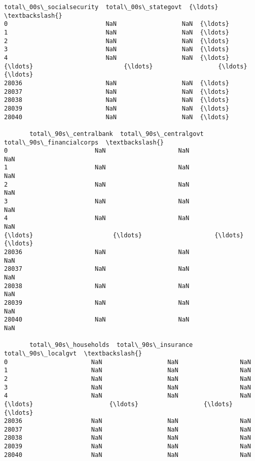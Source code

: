 \documentclass[11pt]{article}
\begin{document}
\begin{Verbatim}[commandchars=\\\{\}]
       total\_00s\_socialsecurity  total\_00s\_stategovt  {\ldots}  \textbackslash{}
0                           NaN                  NaN  {\ldots}
1                           NaN                  NaN  {\ldots}
2                           NaN                  NaN  {\ldots}
3                           NaN                  NaN  {\ldots}
4                           NaN                  NaN  {\ldots}
{\ldots}                         {\ldots}                  {\ldots}  {\ldots}
28036                       NaN                  NaN  {\ldots}
28037                       NaN                  NaN  {\ldots}
28038                       NaN                  NaN  {\ldots}
28039                       NaN                  NaN  {\ldots}
28040                       NaN                  NaN  {\ldots}

       total\_90s\_centralbank  total\_90s\_centralgovt  total\_90s\_financialcorps  \textbackslash{}
0                        NaN                    NaN                       NaN
1                        NaN                    NaN                       NaN
2                        NaN                    NaN                       NaN
3                        NaN                    NaN                       NaN
4                        NaN                    NaN                       NaN
{\ldots}                      {\ldots}                    {\ldots}                       {\ldots}
28036                    NaN                    NaN                       NaN
28037                    NaN                    NaN                       NaN
28038                    NaN                    NaN                       NaN
28039                    NaN                    NaN                       NaN
28040                    NaN                    NaN                       NaN

       total\_90s\_households  total\_90s\_insurance  total\_90s\_localgvt  \textbackslash{}
0                       NaN                  NaN                 NaN
1                       NaN                  NaN                 NaN
2                       NaN                  NaN                 NaN
3                       NaN                  NaN                 NaN
4                       NaN                  NaN                 NaN
{\ldots}                     {\ldots}                  {\ldots}                 {\ldots}
28036                   NaN                  NaN                 NaN
28037                   NaN                  NaN                 NaN
28038                   NaN                  NaN                 NaN
28039                   NaN                  NaN                 NaN
28040                   NaN                  NaN                 NaN


\end{Verbatim}
\end{document}

